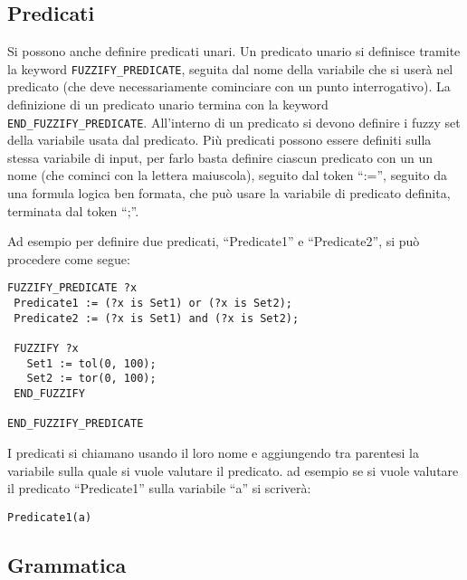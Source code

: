 \subsection{Predicati}
Si possono anche definire predicati unari. Un predicato unario si definisce tramite la keyword \verb|FUZZIFY_PREDICATE|, seguita dal nome della variabile che si userà nel predicato (che deve necessariamente cominciare con un punto interrogativo). La definizione di un predicato unario termina con la keyword \verb|END_FUZZIFY_PREDICATE|. All'interno di un predicato si devono definire i fuzzy set della variabile usata dal predicato. Più predicati possono essere definiti sulla stessa variabile di input, per farlo basta definire ciascun predicato con un un nome (che cominci con la lettera maiuscola), seguito dal token ``:='', seguito da una formula logica ben formata, che può usare la variabile di predicato definita, terminata dal token ``;''.

Ad esempio per definire due predicati, ``Predicate1'' e ``Predicate2'', si può procedere come segue:
\begin{verbatim}
FUZZIFY_PREDICATE ?x
 Predicate1 := (?x is Set1) or (?x is Set2);
 Predicate2 := (?x is Set1) and (?x is Set2);
 
 FUZZIFY ?x
   Set1 := tol(0, 100);
   Set2 := tor(0, 100);
 END_FUZZIFY

END_FUZZIFY_PREDICATE
\end{verbatim}

I predicati si chiamano usando il loro nome e aggiungendo tra parentesi la variabile sulla quale si vuole valutare il predicato. ad esempio se si vuole valutare il predicato ``Predicate1'' sulla variabile ``a'' si scriverà:
\begin{verbatim}
Predicate1(a)
\end{verbatim}

\subsection{Grammatica}

